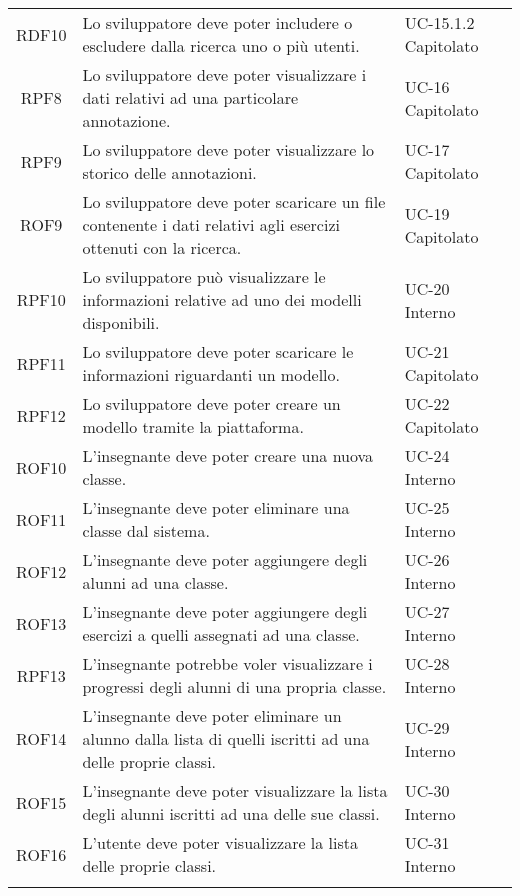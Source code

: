 \begin{tabularx}{\textwidth}{| c | p{10cm} | X |}
		RDF10 &  Lo sviluppatore deve poter includere o escludere dalla ricerca uno o più utenti. & UC-15.1.2 \newline Capitolato\\
		RPF8 & Lo sviluppatore deve poter visualizzare i dati relativi ad una particolare annotazione. & UC-16 \newline Capitolato\\
		RPF9 & Lo sviluppatore deve poter visualizzare lo storico delle annotazioni. & UC-17 \newline Capitolato\\
		ROF9 & Lo sviluppatore deve poter scaricare un file contenente i dati relativi agli esercizi ottenuti con la ricerca. & UC-19 \newline Capitolato\\
		RPF10 & Lo sviluppatore può visualizzare le informazioni relative ad uno dei modelli disponibili. & UC-20 \newline Interno\\
		RPF11 & Lo sviluppatore deve poter scaricare le informazioni riguardanti un modello. & UC-21 \newline Capitolato\\
		RPF12 & Lo sviluppatore deve poter creare un modello tramite la piattaforma. & UC-22 \newline Capitolato\\ 
		ROF10 & L'insegnante deve poter creare una nuova classe. & UC-24 \newline Interno\\
		ROF11 & L'insegnante deve poter eliminare una classe dal sistema. & UC-25 \newline Interno\\
		ROF12 & L'insegnante deve poter aggiungere degli alunni ad una classe. & UC-26 \newline Interno\\
		ROF13 & L'insegnante deve poter aggiungere degli esercizi a quelli assegnati ad una classe. & UC-27 \newline Interno\\
		RPF13 & L'insegnante potrebbe voler visualizzare i progressi degli alunni di una propria classe. & UC-28 \newline Interno\\
		ROF14 & L'insegnante deve poter eliminare un alunno dalla lista di quelli iscritti ad una delle proprie classi. & UC-29 \newline Interno\\
		ROF15 & L'insegnante deve poter visualizzare la lista degli alunni iscritti ad una delle sue classi. & UC-30 \newline Interno\\
		ROF16 & L'utente deve poter visualizzare la lista delle proprie classi. & UC-31 \newline Interno\\
		\hline
		\caption{Tabella dei requisiti funzionali}
\end{tabularx}


